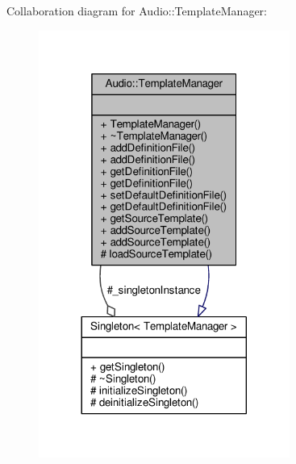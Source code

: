 Collaboration diagram for Audio\+:\+:Template\+Manager\+:
\nopagebreak
\begin{figure}[H]
\begin{center}
\leavevmode
\includegraphics[width=233pt]{d4/d86/classAudio_1_1TemplateManager__coll__graph}
\end{center}
\end{figure}
